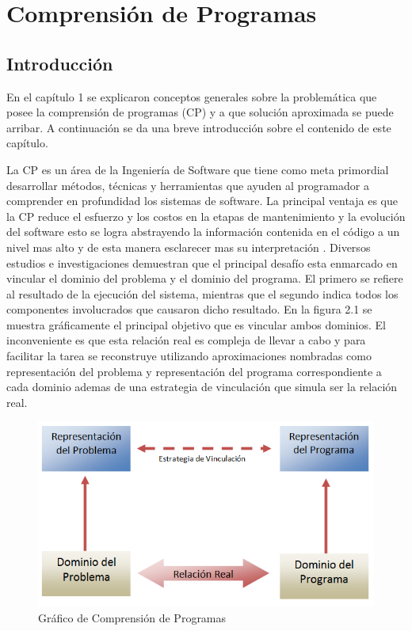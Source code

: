 \documentclass[12pt]{report}
\begin{document}


\chapter{Comprensión de Programas}
\section{Introducción}

En el capítulo 1 se explicaron conceptos generales sobre la problemática que posee la comprensión de programas (CP) y a que solución aproximada se puede arribar. A continuación se da una breve introducción sobre el contenido de este capítulo.

La CP es un área de la Ingeniería de Software que tiene como meta primordial desarrollar métodos, técnicas y herramientas que ayuden al programador a comprender en profundidad los sistemas de software. La principal ventaja es que la CP reduce el esfuerzo y los costos en la etapas de mantenimiento y la evolución del software esto se logra abstrayendo la información contenida en el código a un nivel mas alto y de esta manera esclarecer mas su interpretación \cite{MPMR07}.
Diversos estudios e investigaciones demuestran que el principal desafío esta enmarcado en vincular el dominio del problema y el dominio del programa. El primero se refiere al resultado de la ejecución del sistema, mientras que el segundo indica todos los componentes involucrados que causaron dicho resultado. En la figura 2.1 se muestra gráficamente el principal objetivo que es vincular ambos dominios. El inconveniente es que esta relación real es compleja de llevar a cabo y para facilitar la tarea se reconstruye utilizando aproximaciones nombradas como representación del problema y representación del programa correspondiente a cada dominio ademas de una estrategia de vinculación que simula ser la relación real.

\begin{figure}[h] %
\centering
\includegraphics[scale= 0.50]{./dom.png}
\caption{Gráfico de Comprensión de Programas}
\end{figure} \label{captura1}
\end{document}
